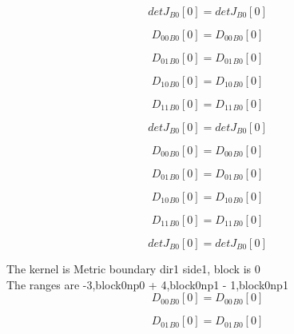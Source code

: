 \documentclass{article}
\begin{document}
\begin{dmath}{detJ{_{B0}}}[{0}] = {detJ{_{B0}}}[{0}]\end{dmath}

\begin{dmath}{D_{00}{_{B0}}}[{0}] = {D_{00}{_{B0}}}[{0}]\end{dmath}

\begin{dmath}{D_{01}{_{B0}}}[{0}] = {D_{01}{_{B0}}}[{0}]\end{dmath}

\begin{dmath}{D_{10}{_{B0}}}[{0}] = {D_{10}{_{B0}}}[{0}]\end{dmath}

\begin{dmath}{D_{11}{_{B0}}}[{0}] = {D_{11}{_{B0}}}[{0}]\end{dmath}

\begin{dmath}{detJ{_{B0}}}[{0}] = {detJ{_{B0}}}[{0}]\end{dmath}

\begin{dmath}{D_{00}{_{B0}}}[{0}] = {D_{00}{_{B0}}}[{0}]\end{dmath}

\begin{dmath}{D_{01}{_{B0}}}[{0}] = {D_{01}{_{B0}}}[{0}]\end{dmath}

\begin{dmath}{D_{10}{_{B0}}}[{0}] = {D_{10}{_{B0}}}[{0}]\end{dmath}

\begin{dmath}{D_{11}{_{B0}}}[{0}] = {D_{11}{_{B0}}}[{0}]\end{dmath}

\begin{dmath}{detJ{_{B0}}}[{0}] = {detJ{_{B0}}}[{0}]\end{dmath}

\noindent The kernel is Metric boundary dir1 side1, block is 0\\\noindent The ranges are -3,block0np0 + 4,block0np1 - 1,block0np1\\\begin{dmath}{D_{00}{_{B0}}}[{0}] = {D_{00}{_{B0}}}[{0}]\end{dmath}

\begin{dmath}{D_{01}{_{B0}}}[{0}] = {D_{01}{_{B0}}}[{0}]\end{dmath}
\end{document}
